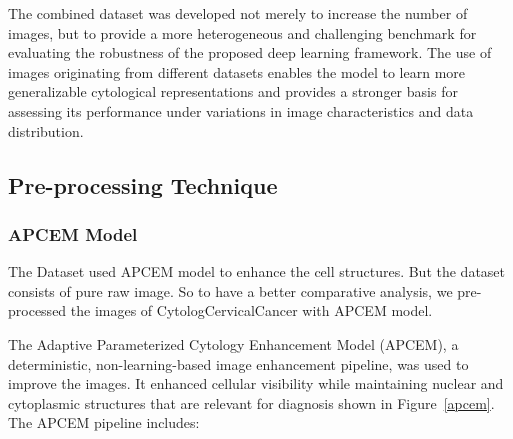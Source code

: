 \documentclass[pdflatex,sn-nature]{sn-jnl}%
\theoremstyle{thmstyleone}%
\theoremstyle{thmstyletwo}%
\theoremstyle{thmstylethree}%
\begin{document}
The combined dataset was developed not merely to increase the number of images, but to provide a more heterogeneous and challenging benchmark for evaluating the robustness of the proposed deep learning framework. The use of images originating from different datasets enables the model to learn more generalizable cytological representations and provides a stronger basis for assessing its performance under variations in image characteristics and data distribution.

\subsection{Pre-processing Technique}
\subsubsection{APCEM Model}
The Dataset\cite{aswini2026apcem} used APCEM model to enhance the cell structures. But the dataset\cite{jnx03_2025} consists of pure raw image. So to have a better comparative analysis, we pre-processed the images of CytologCervicalCancer\cite{jnx03_2025} with APCEM model. 

The Adaptive Parameterized Cytology Enhancement Model (APCEM), a deterministic, non-learning-based image enhancement pipeline, was used to improve the images. It enhanced cellular visibility while maintaining nuclear and cytoplasmic structures that are relevant for diagnosis shown in Figure~\ref{apcem}. The APCEM pipeline includes:
\end{document}
